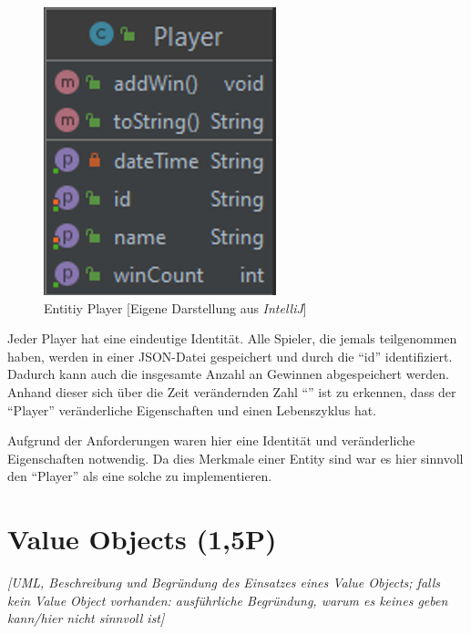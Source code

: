 \begin{figure}[htbp]
\centering
\centerline{\includegraphics[scale=.6]{entities}}
\caption{Entitiy Player [Eigene Darstellung aus \emph{IntelliJ}]}
\label{fig:entities}
\end{figure}

\noindent Jeder Player hat eine eindeutige Identität. Alle Spieler, die jemals teilgenommen haben, werden in einer JSON-Datei gespeichert und durch die \enquote{id} identifiziert. Dadurch kann auch die insgesamte Anzahl an Gewinnen abgespeichert werden. Anhand dieser sich über die Zeit verändernden Zahl \enquote{} ist zu erkennen, dass der \enquote{Player} veränderliche Eigenschaften und einen Lebenszyklus hat. 

Aufgrund der Anforderungen waren hier eine Identität und veränderliche Eigenschaften notwendig. Da dies Merkmale einer Entity sind war es hier sinnvoll den \enquote{Player} als eine solche zu implementieren.

\newpage
\section{Value Objects (1,5P)}
\emph{[UML, Beschreibung und Begründung des Einsatzes eines Value Objects; falls kein Value Object
vorhanden: ausführliche Begründung, warum es keines geben kann/hier nicht sinnvoll ist]}

